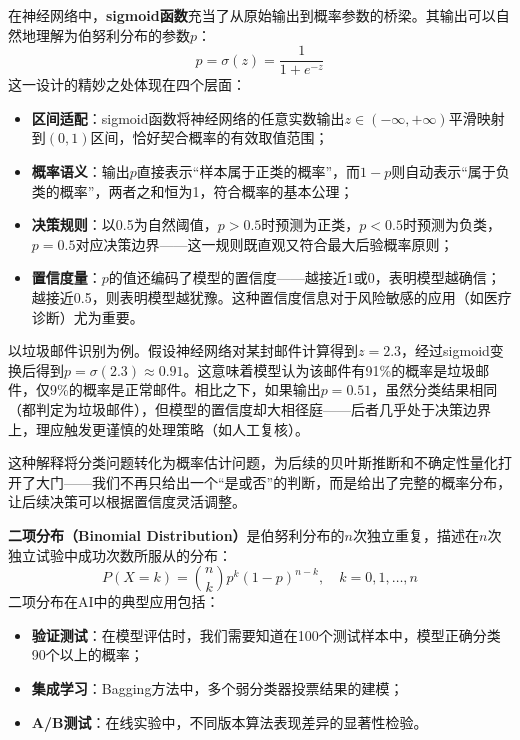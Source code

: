 在神经网络中，\textbf{sigmoid函数}充当了从原始输出到概率参数的桥梁。其输出可以自然地理解为伯努利分布的参数$p$：
\begin{equation}
p = \sigma(z) = \frac{1}{1+e^{-z}}
\end{equation}
这一设计的精妙之处体现在四个层面：

\begin{itemize}
  \item \textbf{区间适配}：sigmoid函数将神经网络的任意实数输出$z \in (-\infty, +\infty)$平滑映射到$(0,1)$区间，恰好契合概率的有效取值范围；

  \item \textbf{概率语义}：输出$p$直接表示``样本属于正类的概率''，而$1-p$则自动表示``属于负类的概率''，两者之和恒为1，符合概率的基本公理；

  \item \textbf{决策规则}：以0.5为自然阈值，$p > 0.5$时预测为正类，$p < 0.5$时预测为负类，$p = 0.5$对应决策边界——这一规则既直观又符合最大后验概率原则；

  \item \textbf{置信度量}：$p$的值还编码了模型的置信度——越接近1或0，表明模型越确信；越接近0.5，则表明模型越犹豫。这种置信度信息对于风险敏感的应用（如医疗诊断）尤为重要。
\end{itemize}

以垃圾邮件识别为例。假设神经网络对某封邮件计算得到$z = 2.3$，经过sigmoid变换后得到$p = \sigma(2.3) \approx 0.91$。这意味着模型认为该邮件有91\%的概率是垃圾邮件，仅9\%的概率是正常邮件。相比之下，如果输出$p = 0.51$，虽然分类结果相同（都判定为垃圾邮件），但模型的置信度却大相径庭——后者几乎处于决策边界上，理应触发更谨慎的处理策略（如人工复核）。

这种解释将分类问题转化为概率估计问题，为后续的贝叶斯推断和不确定性量化打开了大门——我们不再只给出一个``是或否''的判断，而是给出了完整的概率分布，让后续决策可以根据置信度灵活调整。

\textbf{二项分布（Binomial Distribution）}是伯努利分布的$n$次独立重复，描述在$n$次独立试验中成功次数所服从的分布：
\begin{equation}
P(X=k) = \binom{n}{k}p^k(1-p)^{n-k}, \quad k = 0, 1, \ldots, n
\end{equation}
二项分布在AI中的典型应用包括：
\begin{itemize}
  \item \textbf{验证测试}：在模型评估时，我们需要知道在100个测试样本中，模型正确分类90个以上的概率；
  \item \textbf{集成学习}：Bagging方法中，多个弱分类器投票结果的建模；
  \item \textbf{A/B测试}：在线实验中，不同版本算法表现差异的显著性检验。
\end{itemize}

